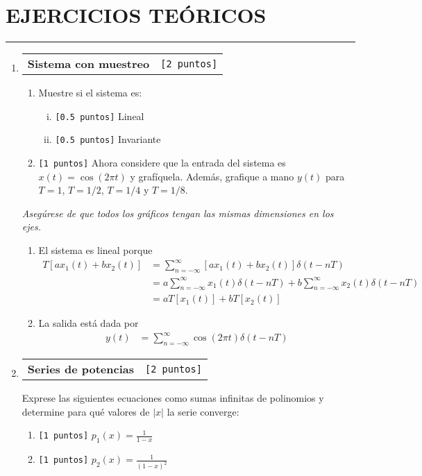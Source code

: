 \documentclass[letterpaper, 12pt]{article}
\makeatletter
\newcommand{\puntos}[1]{\texttt{[#1 puntos]}}
\newenvironment{ejerciciosteoricos}{%
  \clearpage
  \section*{EJERCICIOS TEÓRICOS}
  \hrule
  \vspace{0.5cm}
  \begin{enumerate}[leftmargin=20pt, itemsep=15pt]
}{%
  \end{enumerate}
}
\newenvironment{ejercicio}[2][]{%
  \item
  \noindent\begin{tabularx}{\linewidth}{@{} X r @{}}
    \textbf{#1} & \puntos{#2}
  \end{tabularx}
  
  \begin{tcolorbox}[
    enhanced,
    breakable,
    colback=white,
    colframe=pucgray,
    boxrule=1pt,
    rounded corners=5pt,
    left=10pt,
    right=10pt,
    top=8pt,
    bottom=8pt
  ]
}{%
  \end{tcolorbox}
  \vspace{0.5cm}
}
\newif\ifanswers
\newenvironment{solucion}{%
  \ifanswers
    \begin{tcolorbox}[
      enhanced,
      breakable,
      colback=black!5,
      colframe=black!50,
      boxrule=1pt,
      rounded corners=5pt,
      left=8pt,
      right=8pt,
      top=8pt,
      bottom=8pt,
      title={\textbf{SOLUCIÓN}},
      fonttitle=\bfseries
    ]
  \fi
}{%
  \ifanswers
    \end{tcolorbox}
  \fi
}
\makeatother
\begin{document}
\begin{ejerciciosteoricos}
\begin{ejercicio}[Sistema con muestreo]{2}
  \begin{enumerate}
    \item Muestre si el sistema es:
    \begin{enumerate}[i)]
      \item \puntos{0.5} Lineal
      \item \puntos{0.5} Invariante
    \end{enumerate}
    
    \item \puntos{1} Ahora considere que la entrada del sistema es $x(t) = \cos{(2\pi t)}$ y grafíquela. Además, grafique a mano $y(t)$ para $T =1$, $T=1/2$, $T=1/4$ y $T =1/8$.
  \end{enumerate}
  
  \textit{Asegúrese de que todos los gráficos tengan las mismas dimensiones en los ejes.}
  
  \begin{solucion}
    \begin{enumerate}
      \item El sistema es lineal porque
      \begin{align*}
          T[ax_1(t)+bx_2(t)] &= \sum_{n=-\infty}^{\infty} [ax_1(t)+bx_2(t)]\delta(t-nT) \\
          &= a \sum_{n=-\infty}^{\infty} x_1(t) \delta(t-n T) + b \sum_{n=-\infty}^{\infty} x_2(t) \delta(t-n T) \\
          &= a T[x_1(t)] + b T[x_2(t)]
      \end{align*}
      
      \item La salida está dada por
      \begin{align*}
          y(t) &= \sum_{n=-\infty}^{\infty} \cos(2\pi t) \delta(t-n T)
      \end{align*}
    \end{enumerate}
  \end{solucion}
\end{ejercicio}

\begin{ejercicio}[Series de potencias]{2}
  Exprese las siguientes ecuaciones como sumas infinitas de polinomios y determine para qué valores de $|x|$ la serie converge:
  
  \begin{enumerate}
    \item \puntos{1} $p_1(x) = \frac{1}{1-x}$
    \item \puntos{1} $p_2(x) = \frac{1}{(1-x)^2}$
  \end{enumerate}
  

\end{ejercicio}
\end{ejerciciosteoricos}
\end{document}
